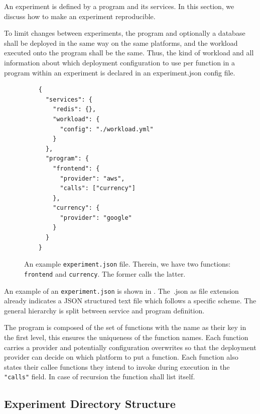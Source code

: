 \documentclass[../main.tex]{subfiles}
\begin{document}
An experiment is defined by a program and its services. 
In this section, we discuss how to make an experiment reproducible. 

To limit changes between experiments, the program and optionally a database shall be deployed in the same way on the same platforms, 
and the workload executed onto the program shall be the same. 
Thus, the kind of workload and all information about which deployment configuration
to use per function in a program within an experiment is declared in an experiment.json config file.

\begin{figure}
  \begin{tcolorbox}
    \begin{verbatim}
    {
      "services": {
        "redis": {},
        "workload": {
          "config": "./workload.yml"
        }
      },
      "program": {
        "frontend": {
          "provider": "aws",
          "calls": ["currency"]
        },
        "currency": {
          "provider": "google"
        }
      }
    }
    \end{verbatim}
  \end{tcolorbox}
\caption[experiment.json Config Example]{An example \texttt{experiment.json} file. 
Therein, we have two functions: \texttt{frontend} and \texttt{currency}. The former calls the latter.}%
\label{fig:exampleExperimentConfig}
\end{figure}

An example of an \texttt{experiment.json} is shown in .
The~.json as file extension already indicates a JSON structured text file which follows a specific scheme. 
The general hierarchy is split between service and program definition.

The program is  composed of the set of functions with the name as their key in the first level, 
this ensures the uniqueness of the function names. 
Each function carries a provider and potentially configuration overwrites so that the deployment provider can decide 
on which platform to put a function. 
Each function also states their callee functions they intend to invoke during execution in the \texttt{"calls"} field. 
In case of recursion the function shall list itself. 

\subsection{Experiment Directory Structure}%
\label{sec:experimentDirectoryStructure}
\end{document}
